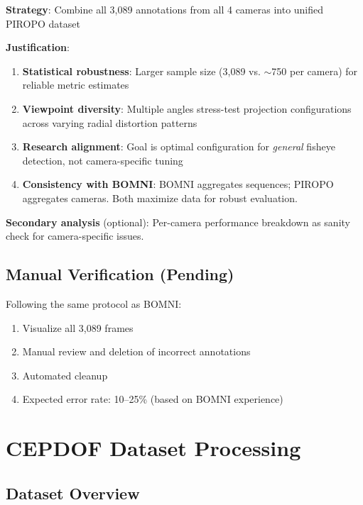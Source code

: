 \documentclass[11pt]{article}
\begin{document}
\textbf{Strategy}: Combine all 3,089 annotations from all 4 cameras into unified PIROPO dataset

\textbf{Justification}:
\begin{enumerate}[leftmargin=*]
    \item \textbf{Statistical robustness}: Larger sample size (3,089 vs. $\sim$750 per camera) for reliable metric estimates
    \item \textbf{Viewpoint diversity}: Multiple angles stress-test projection configurations across varying radial distortion patterns
    \item \textbf{Research alignment}: Goal is optimal configuration for \textit{general} fisheye detection, not camera-specific tuning
    \item \textbf{Consistency with BOMNI}: BOMNI aggregates sequences; PIROPO aggregates cameras. Both maximize data for robust evaluation.
\end{enumerate}

\textbf{Secondary analysis} (optional): Per-camera performance breakdown as sanity check for camera-specific issues.

\subsection{Manual Verification (Pending)}

Following the same protocol as BOMNI:
\begin{enumerate}[leftmargin=*]
    \item Visualize all 3,089 frames
    \item Manual review and deletion of incorrect annotations
    \item Automated cleanup
    \item Expected error rate: 10--25\% (based on BOMNI experience)
\end{enumerate}

\section{CEPDOF Dataset Processing}

\subsection{Dataset Overview}
\end{document}
